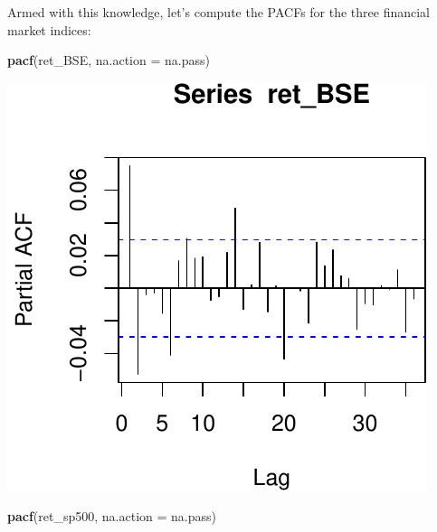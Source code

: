 \documentclass[11pt,]{article}
\newenvironment{Shaded}{\begin{snugshade}}{\end{snugshade}}
\newcommand{\KeywordTok}[1]{\textcolor[rgb]{0.13,0.29,0.53}{\textbf{#1}}}
\newcommand{\DataTypeTok}[1]{\textcolor[rgb]{0.13,0.29,0.53}{#1}}
\newcommand{\NormalTok}[1]{#1}
\begin{document}
Armed with this knowledge, let's compute the PACFs for the three
financial market indices:

\begin{Shaded}
\begin{Highlighting}[]
\KeywordTok{pacf}\NormalTok{(ret_BSE, }\DataTypeTok{na.action =}\NormalTok{ na.pass)}
\end{Highlighting}
\end{Shaded}

\begin{center}\includegraphics{FMC_T4_PhD_ARMA_GARCH_files/figure-latex/PACF-1} \end{center}

\begin{Shaded}
\begin{Highlighting}[]
\KeywordTok{pacf}\NormalTok{(ret_sp500, }\DataTypeTok{na.action =}\NormalTok{ na.pass)}
\end{Highlighting}
\end{Shaded}
\end{document}
